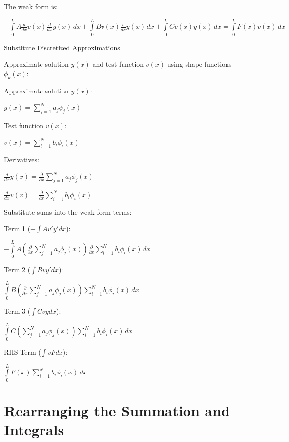 \documentclass[
  11pt,
  a4paper,
]{scrbook}
\begin{document}
The weak form is:

$\displaystyle - \int\limits_{0}^{L} A \frac{d}{d x} v{\left(x \right)} \frac{d}{d x} y{\left(x \right)}\, dx + \int\limits_{0}^{L} B v{\left(x \right)} \frac{d}{d x} y{\left(x \right)}\, dx + \int\limits_{0}^{L} C v{\left(x \right)} y{\left(x \right)}\, dx = \int\limits_{0}^{L} F{\left(x \right)} v{\left(x \right)}\, dx$

Substitute Discretized Approximations

Approximate solution \(y(x)\) and test function \(v(x)\) using shape
functions \(\phi_k(x)\):

Approximate solution \(y(x)\):

$\displaystyle y{\left(x \right)} = \sum_{j=1}^{N} {a}_{j} \phi_{j}(x)$

Test function \(v(x)\):

$\displaystyle v{\left(x \right)} = \sum_{i=1}^{N} {b}_{i} \phi_{i}(x)$

Derivatives:

$\displaystyle \frac{d}{d x} y{\left(x \right)} = \frac{\partial}{\partial x} \sum_{j=1}^{N} {a}_{j} \phi_{j}(x)$

$\displaystyle \frac{d}{d x} v{\left(x \right)} = \frac{\partial}{\partial x} \sum_{i=1}^{N} {b}_{i} \phi_{i}(x)$

Substitute sums into the weak form terms:

Term 1 (\(-\int A v' y' dx\)):

$\displaystyle - \int\limits_{0}^{L} A \left(\frac{\partial}{\partial x} \sum_{j=1}^{N} {a}_{j} \phi_{j}(x)\right) \frac{\partial}{\partial x} \sum_{i=1}^{N} {b}_{i} \phi_{i}(x)\, dx$

Term 2 (\(\int B v y' dx\)):

$\displaystyle \int\limits_{0}^{L} B \left(\frac{\partial}{\partial x} \sum_{j=1}^{N} {a}_{j} \phi_{j}(x)\right) \sum_{i=1}^{N} {b}_{i} \phi_{i}(x)\, dx$

Term 3 (\(\int C v y dx\)):

$\displaystyle \int\limits_{0}^{L} C \left(\sum_{j=1}^{N} {a}_{j} \phi_{j}(x)\right) \sum_{i=1}^{N} {b}_{i} \phi_{i}(x)\, dx$

RHS Term (\(\int v F dx\)):

$\displaystyle \int\limits_{0}^{L} F{\left(x \right)} \sum_{i=1}^{N} {b}_{i} \phi_{i}(x)\, dx$

\section{Rearranging the Summation and
Integrals}\label{rearranging-the-summation-and-integrals}
\end{document}
